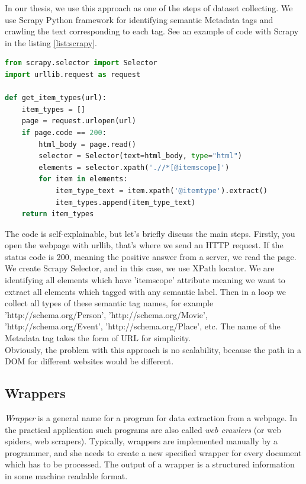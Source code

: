 In our thesis, we use this approach as one of the steps of dataset collecting. We use Scrapy Python framework \cite{Scrapy} for identifying semantic Metadata tags and crawling the text corresponding to each tag. See an example of code with Scrapy in the listing \ref{list:scrapy}.\\

\begin{lstlisting}[language=Python, caption={Example of meta tag text scrapping with Scrapy Python framework}, label={list:scrapy}, captionpos=b]
from scrapy.selector import Selector
import urllib.request as request

def get_item_types(url):
    item_types = []
    page = request.urlopen(url)
    if page.code == 200:
        html_body = page.read()
        selector = Selector(text=html_body, type="html")
        elements = selector.xpath('.//*[@itemscope]')
        for item in elements:
            item_type_text = item.xpath('@itemtype').extract()
            item_types.append(item_type_text)
    return item_types 
\end{lstlisting}

The code is self-explainable, but let's briefly discuss the main steps. Firstly, you open the webpage with urllib, that's where we send an HTTP request. If the status code is 200, meaning the positive answer from a server, we read the page. We create Scrapy Selector, and in this case, we use XPath locator. We are identifying all elements which have 'itemscope' attribute meaning we want to extract all elements which tagged with any semantic label. Then in a loop we collect all types of these semantic tag names, for example 'http://schema.org/Person', 'http://schema.org/Movie', 'http://schema.org/Event', 'http://schema.org/Place', etc. The name of the Metadata tag takes the form of URL for simplicity. \\

Obviously, the problem with this approach is no scalability, because the path in a DOM for different websites would be different. \\

\subsection{Wrappers}

\textit{Wrapper} is a general name for a program for data extraction from a webpage. In the practical application such programs are also called \textit{web crawlers} (or web spiders, web scrapers). Typically, wrappers are implemented manually by a programmer, and she needs to create a new specified wrapper for every document which has to be processed. The output of a wrapper is a structured information in some machine readable format. \\

